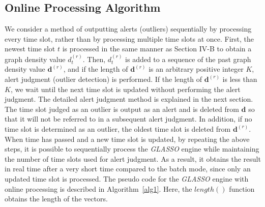 \documentclass[conference]{IEEEtran}
\begin{document}
\subsection{Online Processing Algorithm}
We consider a method of outputting alerts (outliers) sequentially by processing every time slot, rather than by processing multiple time slots at once.
First, the newest time slot $t$ is processed in the same manner as Section I\hspace{-.1em}V-B to obtain a graph density value $d_t^{(r)}$.
Then, $d_t^{(r)}$ is added to a sequence of the past graph density value $\bm{d}^{(r)}$, and if the length of $\bm{d}^{(r)}$ is an arbitrary positive integer $K$, alert judgment (outlier detection) is performed.
If the length of $\bm{d}^{(r)}$ is less than $K$, we wait until the next time slot is updated without performing the alert judgment.
The detailed alert judgment method is explained in the next section.
The time slot judged as an outlier is output as an alert and is deleted from $\bm{d}$ so that it will not be referred to in a subsequent alert judgment.
In addition, if no time slot is determined as an outlier, the oldest time slot is deleted from $\bm{d}^{(r)}$.
When time has passed and a new time slot is updated, by repeating the above steps, it is possible to sequentially process the {\it GLASSO} engine while maintaining the number of time slots used for alert judgment.
As a result, it obtains the result in real time after a very short time compared to the batch mode, since only an updated time slot is processed.
The pseudo code for the {\it GLASSO} engine with online processing is described in Algorithm~\ref{alg1}.
Here, the $length()$ function obtains the length of the vectors.


\end{document}
